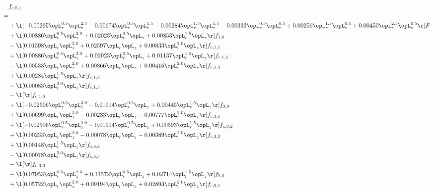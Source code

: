 \begin{alignat}{2} 
\label{eq:f_51_1} 
& f_{c,5,1} \nonumber \\ 
 = \\ 
& + \l[  -0.00295 \opL_r^{0.5} \opL_z^{2.5}   -0.00674 \opL_r^{0.5} \opL_z^{1.5}   -0.00284 \opL_r^{1.5} \opL_z^{1.5}   -0.00333 \opL_r^{0.5} \opL_z^{0.5} +  0.00256 \opL_r^{1.5} \opL_z^{0.5} +  0.00450 \opL_r^{2.5} \opL_z^{0.5}  \r] F \nonumber \\ 
& + \l[  0.00886 \opL_r^{0.5} \opL_z^{2.0} +  0.02023 \opL_r^{0.5} \opL_z +  0.00853 \opL_r^{1.5} \opL_z  \r] f_{1,0} \nonumber \\ 
& - \l[  0.01598 \opL_r \opL_z^{2.0} +  0.02597 \opL_r \opL_z +  0.00833 \opL_r^{2.0} \opL_z  \r] f_{c,1,1} \nonumber \\ 
& + \l[  0.00886 \opL_r^{0.5} \opL_z^{2.0} +  0.02023 \opL_r^{0.5} \opL_z +  0.01137 \opL_r^{1.5} \opL_z  \r] f_{c,1,2} \nonumber \\ 
& - \l[  0.00533 \opL_r \opL_z^{2.0} +  0.00866 \opL_r \opL_z +  0.00416 \opL_r^{2.0} \opL_z  \r] f_{c,1,3} \nonumber \\ 
& + \l[  0.00284 \opL_r^{1.5} \opL_z  \r] f_{c,1,4} \nonumber \\ 
& - \l[  0.00083 \opL_r^{2.0} \opL_z  \r] f_{c,1,5} \nonumber \\ 
& - \l[  \r] f_{c,1,6} \nonumber \\ 
& + \l[  -0.02506 \opL_r^{0.5} \opL_z^{2.0}   -0.01914 \opL_r^{0.5} \opL_z +  0.00445 \opL_r^{1.5} \opL_z  \r] f_{3,0} \nonumber \\ 
& + \l[  0.00699 \opL_r \opL_z^{2.0}   -0.00233 \opL_r \opL_z   -0.00777 \opL_r^{2.0} \opL_z  \r] f_{c,3,1} \nonumber \\ 
& + \l[  -0.02506 \opL_r^{0.5} \opL_z^{2.0}   -0.01914 \opL_r^{0.5} \opL_z +  0.00593 \opL_r^{1.5} \opL_z  \r] f_{c,3,2} \nonumber \\ 
& + \l[  0.00233 \opL_r \opL_z^{2.0}   -0.00078 \opL_r \opL_z   -0.00389 \opL_r^{2.0} \opL_z  \r] f_{c,3,3} \nonumber \\ 
& + \l[  0.00148 \opL_r^{1.5} \opL_z  \r] f_{c,3,4} \nonumber \\ 
& - \l[  0.00078 \opL_r^{2.0} \opL_z  \r] f_{c,3,5} \nonumber \\ 
& - \l[  \r] f_{c,3,6} \nonumber \\ 
& - \l[  0.07953 \opL_r^{0.5} \opL_z^{2.0} +  0.11572 \opL_r^{0.5} \opL_z +  0.02714 \opL_r^{1.5} \opL_z  \r] f_{5,0} \nonumber \\ 
& + \l[  0.05722 \opL_r \opL_z^{2.0} +  0.09194 \opL_r \opL_z +  0.02893 \opL_r^{2.0} \opL_z  \r] f_{c,5,1} \nonumber \\ 

\end{alignat}
